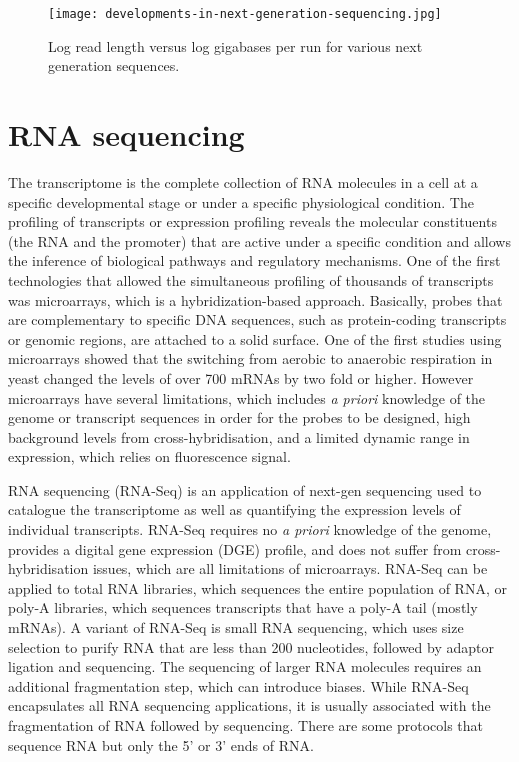 \begin{figure}[!ht]
   \centering
   \texttt{[image: developments-in-next-generation-sequencing.jpg]}
   \caption[Developments in next generation sequencing]{Log read length versus log gigabases per run for various next generation sequences\cite{Nederbragt2012}.}
   \label{fig:dev_next_gen}
\end{figure}

\section{RNA sequencing}

The transcriptome is the complete collection of RNA molecules in a cell at a specific developmental stage or under a specific physiological condition. The profiling of transcripts or expression profiling reveals the molecular constituents (the RNA and the promoter) that are active under a specific condition and allows the inference of biological pathways and regulatory mechanisms. One of the first technologies that allowed the simultaneous profiling of thousands of transcripts was microarrays\cite{pmid7569999}, which is a hybridization-based approach. Basically, probes that are complementary to specific DNA sequences, such as protein-coding transcripts or genomic regions, are attached to a solid surface. One of the first studies using microarrays showed that the switching from aerobic to anaerobic respiration in yeast changed the levels of over 700 mRNAs by two fold or higher\cite{pmid9381177}. However microarrays have several limitations, which includes \textit{a priori} knowledge of the genome or transcript sequences in order for the probes to be designed, high background levels from cross-hybridisation\cite{pmid16749918}, and a limited dynamic range in expression, which relies on fluorescence signal. 

RNA sequencing (RNA-Seq) is an application of next-gen sequencing used to catalogue the transcriptome as well as quantifying the expression levels of individual transcripts\cite{pmid19015660}. RNA-Seq requires no \textit{a priori} knowledge of the genome, provides a digital gene expression (DGE) profile, and does not suffer from cross-hybridisation issues, which are all limitations of microarrays. RNA-Seq can be applied to total RNA libraries, which sequences the entire population of RNA, or poly-A libraries, which sequences transcripts that have a poly-A tail (mostly mRNAs). A variant of RNA-Seq is small RNA sequencing, which uses size selection to purify RNA that are less than 200 nucleotides, followed by adaptor ligation and sequencing. The sequencing of larger RNA molecules requires an additional fragmentation step, which can introduce biases\cite{pmid18516045}. While RNA-Seq encapsulates all RNA sequencing applications, it is usually associated with the fragmentation of RNA followed by sequencing. There are some protocols that sequence RNA but only the 5'\cite{pmid15300261,pmid14663149} or 3'\cite{pmid22454233} ends of RNA.

